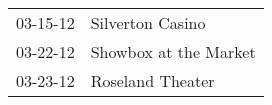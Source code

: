 \begin{supertabular}{p{0.25\columnwidth}p{0.75\columnwidth}}
 03-15-12 &       Silverton Casino \\
 03-22-12 &  Showbox at the Market \\
 03-23-12 &       Roseland Theater \\
\end{supertabular}
